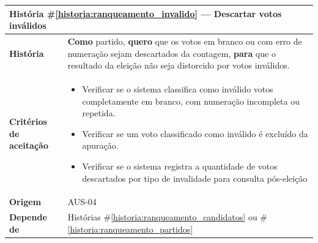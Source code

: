 \documentclass[12pt,a4paper]{article}
\newcounter{historia}
\begin{document}
\label{historia:ranqueamento_invalido}
\begin{table}[H]
    \centering
    \begin{tabular}{|m{4.5cm} | m{11cm}|}
    \hline
    
    \multicolumn{2}{|l|}{\textbf{História \#\ref{historia:ranqueamento_invalido} --- Descartar votos inválidos}} \\
    
    \hline  \textbf{História} &
    \textbf{Como} partido, \newline
    \textbf{quero} que os votos em branco ou com erro de numeração sejam descartados da contagem, \newline  
    \textbf{para} que o resultado da eleição não seja distorcido por votos inválidos. \\
    
    \textbf{Critérios de aceitação} &
    \begin{itemize}
        \item{Verificar se o sistema classifica como inválido votos completamente em branco, com numeração incompleta ou repetida.}
        \item{Verificar se um voto classificado como inválido é excluído da apuração.}
        \item{Verificar se o sistema registra a quantidade de votos descartados por tipo de invalidade para consulta pós-eleição}
    \end{itemize}\\
    
    
    \textbf{Origem} &
    AUS-04 \\
    
    \textbf{Depende de} &
    Histórias \#\ref{historia:ranqueamento_candidatos} ou \#\ref{historia:ranqueamento_partidos} \\
    
    \hline
    \end{tabular}
\end{table}
\end{document}
